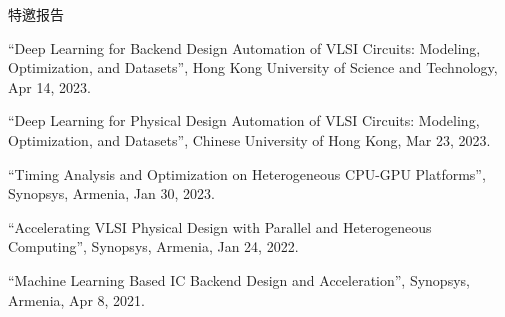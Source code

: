 \begin{rSection}{特邀报告}
\begin{description}[font=\normalfont]
\item[{[T5]}]{
``Deep Learning for Backend Design Automation of VLSI Circuits: Modeling, Optimization, and Datasets'', Hong Kong University of Science and Technology, Apr 14, 2023. 
}

\item[{[T4]}]{
``Deep Learning for Physical Design Automation of VLSI Circuits: Modeling, Optimization, and Datasets'', Chinese University of Hong Kong, Mar 23, 2023. 
}

\item[{[T3]}]{
``Timing Analysis and Optimization on Heterogeneous CPU-GPU Platforms'', Synopsys, Armenia, Jan 30, 2023. 
}

\item[{[T2]}]{
``Accelerating VLSI Physical Design with Parallel and Heterogeneous Computing'', Synopsys, Armenia, Jan 24, 2022. 
}

\item[{[T1]}]{
``Machine Learning Based IC Backend Design and Acceleration'', Synopsys, Armenia, Apr 8, 2021. 
}

\end{description}

\end{rSection}
